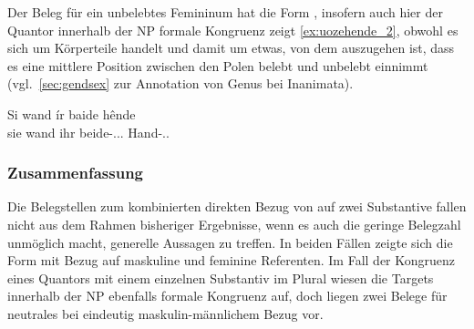 Der Beleg für ein unbelebtes Femininum hat die Form , insofern auch
hier der Quantor innerhalb der NP formale Kongruenz zeigt
\cref{ex:uozehende_2}, obwohl es sich um Körperteile handelt und damit um
etwas, von dem auszugehen ist, dass es eine mittlere Position zwischen den
Polen belebt und unbelebt einnimmt (vgl.~\cref{sec:gendsex} zur Annotation von
Genus bei Inanimata).

\begin{exe}

	\ex \gll Si wand ír baide hênde \\
			sie wand ihr beide-\Acc.\Pl.\FemI.\St{} Hand-\Acc.\Pl.\FemI{} \\
		\begin{taggedline}{\parencites[\pno~6rb,19]{kc:K}[vgl.][913]{schroeder1895}}
		\trans {}
		\end{taggedline}
		\label{ex:uozehende_2}
\end{exe}


\subsubsection{Zusammenfassung}

Die Belegstellen zum kombinierten direkten Bezug von \mbox{} auf
zwei Substantive fallen nicht aus dem Rahmen bisheriger Ergebnisse, wenn es
auch die geringe Belegzahl unmöglich macht, generelle Aussagen zu treffen. In
beiden Fällen zeigte sich die Form  mit Bezug auf maskuline und
feminine Referenten. Im Fall der Kongruenz eines Quantors mit einem einzelnen
Substantiv im Plural wiesen die Targets innerhalb der NP ebenfalls formale
Kongruenz auf, doch liegen zwei Belege für neutrales  bei
eindeutig maskulin-männlichem Bezug vor.

